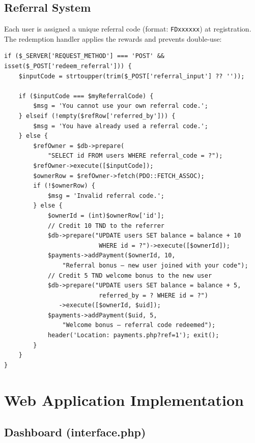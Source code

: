 \documentclass[12pt,a4paper,openright]{report}
\begin{document}
\subsection{Referral System}

Each user is assigned a unique referral code (format: \texttt{FDxxxxxx}) at registration. The redemption handler applies the rewards and prevents double-use:

\begin{lstlisting}[style=phpstyle, caption={Referral Code Redemption Handler}]
if ($_SERVER['REQUEST_METHOD'] === 'POST' && isset($_POST['redeem_referral'])) {
    $inputCode = strtoupper(trim($_POST['referral_input'] ?? ''));

    if ($inputCode === $myReferralCode) {
        $msg = 'You cannot use your own referral code.';
    } elseif (!empty($refRow['referred_by'])) {
        $msg = 'You have already used a referral code.';
    } else {
        $refOwner = $db->prepare(
            "SELECT id FROM users WHERE referral_code = ?");
        $refOwner->execute([$inputCode]);
        $ownerRow = $refOwner->fetch(PDO::FETCH_ASSOC);
        if (!$ownerRow) {
            $msg = 'Invalid referral code.';
        } else {
            $ownerId = (int)$ownerRow['id'];
            // Credit 10 TND to the referrer
            $db->prepare("UPDATE users SET balance = balance + 10
                          WHERE id = ?")->execute([$ownerId]);
            $payments->addPayment($ownerId, 10,
                "Referral bonus — new user joined with your code");
            // Credit 5 TND welcome bonus to the new user
            $db->prepare("UPDATE users SET balance = balance + 5,
                          referred_by = ? WHERE id = ?")
               ->execute([$ownerId, $uid]);
            $payments->addPayment($uid, 5,
                "Welcome bonus — referral code redeemed");
            header('Location: payments.php?ref=1'); exit();
        }
    }
}
\end{lstlisting}

\section{Web Application Implementation}

\subsection{Dashboard (interface.php)}
\end{document}
